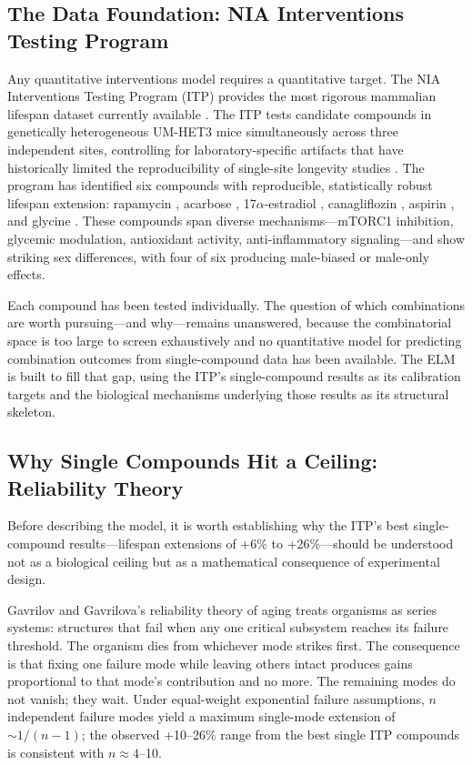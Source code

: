 \documentclass[11pt]{article}
\begin{document}
\subsection{The Data Foundation: NIA Interventions Testing Program}

Any quantitative interventions model requires a quantitative target. The NIA Interventions Testing Program (ITP) provides the most rigorous mammalian lifespan dataset currently available \citep{Miller2007,Strong2008,Harrison2009}. The ITP tests candidate compounds in genetically heterogeneous UM-HET3 mice simultaneously across three independent sites, controlling for laboratory-specific artifacts that have historically limited the reproducibility of single-site longevity studies \citep{Nadon2017}. The program has identified six compounds with reproducible, statistically robust lifespan extension: rapamycin \citep{Miller2011rapa}, acarbose \citep{Harrison2014}, 17$\alpha$-estradiol \citep{Stout2017}, canagliflozin \citep{Miller2020}, aspirin \citep{Strong2016}, and glycine \citep{Miller2019glycine}. These compounds span diverse mechanisms---mTORC1 inhibition, glycemic modulation, antioxidant activity, anti-inflammatory signaling---and show striking sex differences, with four of six producing male-biased or male-only effects.

Each compound has been tested individually. The question of which combinations are worth pursuing---and why---remains unanswered, because the combinatorial space is too large to screen exhaustively and no quantitative model for predicting combination outcomes from single-compound data has been available. The ELM is built to fill that gap, using the ITP's single-compound results as its calibration targets and the biological mechanisms underlying those results as its structural skeleton.

\subsection{Why Single Compounds Hit a Ceiling: Reliability Theory}

Before describing the model, it is worth establishing why the ITP's best single-compound results---lifespan extensions of +6\% to +26\%---should be understood not as a biological ceiling but as a mathematical consequence of experimental design.

Gavrilov and Gavrilova's reliability theory of aging \citep{Gavrilov2001,Gavrilov2006} treats organisms as series systems: structures that fail when any one critical subsystem reaches its failure threshold. The organism dies from whichever mode strikes first. The consequence is that fixing one failure mode while leaving others intact produces gains proportional to that mode's contribution and no more. The remaining modes do not vanish; they wait. Under equal-weight exponential failure assumptions, $n$ independent failure modes yield a maximum single-mode extension of $\sim 1/(n-1)$; the observed +10--26\% range from the best single ITP compounds is consistent with $n \approx 4$--10.
\end{document}
